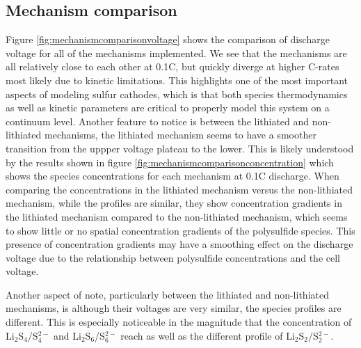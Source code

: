 \documentclass{elsarticle}
\begin{document}
\subsection{Mechanism comparison}

Figure \ref{fig:mechanismcomparisonvoltage} shows the comparison of discharge voltage for all of the mechanisms implemented. We see that the mechanisms are all relatively close to each other at 0.1C, but quickly diverge at higher C-rates most likely due to kinetic limitations. This highlights one of the most important aspects of modeling sulfur cathodes, which is that both species thermodynamics as well as kinetic parameters are critical to properly model this system on a continuum level. Another feature to notice is between the lithiated and non-lithiated mechanisms, the lithiated mechanism seems to have a smoother transition from the uppper voltage plateau to the lower. This is likely understood by the results shown in figure \ref{fig:mechanismcomparisonconcentration} which shows the species concentrations for each mechanism at 0.1C discharge. When comparing the concentrations in the lithiated mechanism versus the non-lithiated mechanism, while the profiles are similar, they show concentration gradients in the lithiated mechanism compared to the non-lithiated mechanism, which seems to show little or no spatial concentration gradients of the polysulfide species. This presence of concentration gradients may have a smoothing effect on the discharge voltage due to the relationship between polysulfide concentrations and the cell voltage. 

Another aspect of note, particularly between the lithiated and non-lithiated mechanisms, is although their voltages are very similar, the species profiles are different. This is especially noticeable in the magnitude that the concentration of Li$_2$S$_4$/S$_4^{2-}$ and Li$_2$S$_6$/S$_6^{2-}$ reach as well as the different profile of Li$_2$S$_2$/S$_2^{2-}$. 
\end{document}
